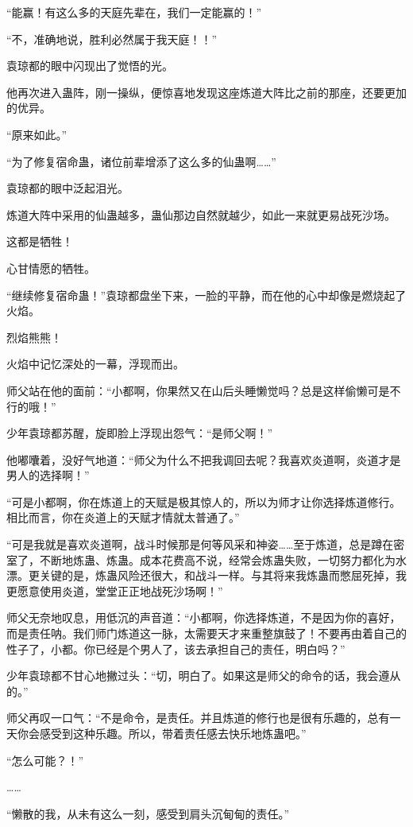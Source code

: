 \begin{this_body}
“能赢！有这么多的天庭先辈在，我们一定能赢的！”

“不，准确地说，胜利必然属于我天庭！！”

袁琼都的眼中闪现出了觉悟的光。

他再次进入蛊阵，刚一操纵，便惊喜地发现这座炼道大阵比之前的那座，还要更加的优异。

“原来如此。”

“为了修复宿命蛊，诸位前辈增添了这么多的仙蛊啊……”

袁琼都的眼中泛起泪光。

炼道大阵中采用的仙蛊越多，蛊仙那边自然就越少，如此一来就更易战死沙场。

这都是牺牲！

心甘情愿的牺牲。

“继续修复宿命蛊！”袁琼都盘坐下来，一脸的平静，而在他的心中却像是燃烧起了火焰。

烈焰熊熊！

火焰中记忆深处的一幕，浮现而出。

师父站在他的面前：“小都啊，你果然又在山后头睡懒觉吗？总是这样偷懒可是不行的哦！”

少年袁琼都苏醒，旋即脸上浮现出怨气：“是师父啊！”

他嘟囔着，没好气地道：“师父为什么不把我调回去呢？我喜欢炎道啊，炎道才是男人的选择啊！”

“可是小都啊，你在炼道上的天赋是极其惊人的，所以为师才让你选择炼道修行。相比而言，你在炎道上的天赋才情就太普通了。”

“可是我就是喜欢炎道啊，战斗时候那是何等风采和神姿……至于炼道，总是蹲在密室了，不断地炼蛊、炼蛊。成本花费高不说，经常会炼蛊失败，一切努力都化为水漂。更关键的是，炼蛊风险还很大，和战斗一样。与其将来我炼蛊而憋屈死掉，我更愿意使用炎道，堂堂正正地战死沙场啊！”

师父无奈地叹息，用低沉的声音道：“小都啊，你选择炼道，不是因为你的喜好，而是责任呐。我们师门炼道这一脉，太需要天才来重整旗鼓了！不要再由着自己的性子了，小都。你已经是个男人了，该去承担自己的责任，明白吗？”

少年袁琼都不甘心地撇过头：“切，明白了。如果这是师父的命令的话，我会遵从的。”

师父再叹一口气：“不是命令，是责任。并且炼道的修行也是很有乐趣的，总有一天你会感受到这种乐趣。所以，带着责任感去快乐地炼蛊吧。”

“怎么可能？！”

……

“懒散的我，从未有这么一刻，感受到肩头沉甸甸的责任。”


\end{this_body}
